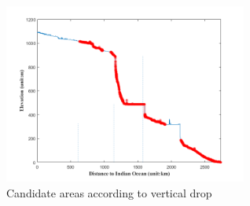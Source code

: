 \documentclass{mcmthesis}
\begin{document}
\begin{figure}[h]
\small
\centering
\includegraphics[width=8cm]{./figures/highlight0.png}
\caption{Candidate areas according to vertical drop} \label{fig:Fig3}
\end{figure}
\end{document}
